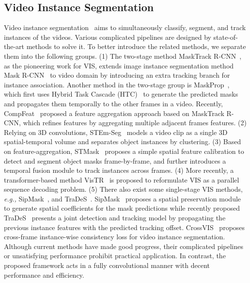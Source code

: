 \documentclass[runningheads]{llncs}
\begin{document}
\subsection{Video Instance Segmentation}
Video instance segmentation~\cite{yang2019video} aims to simultaneously classify, segment, and track instances of the videos. Various complicated pipelines are designed by state-of-the-art methods to solve it. To better introduce the related methods, we separate them into the following groups. (1) The two-stage method MaskTrack R-CNN~\cite{yang2019video}, as the pioneering work for VIS, extends image instance segmentation method Mask R-CNN~\cite{he2017mask} to video domain by introducing an extra tracking branch for instance association. Another method in the two-stage group is MaskProp~\cite{bertasius2020classifying}, which first uses Hybrid Task Cascade (HTC)~\cite{chen2019hybrid} to generate the predicted masks and propagates them temporally to the other frames in a video. Recently, CompFeat~\cite{fu2020compfeat} proposed a feature aggregation approach based on MaskTrack R-CNN, which refines features by aggregating multiple adjacent frames features. (2) Relying on 3D convolutions, STEm-Seg~\cite{athar2020stem} models a video clip as a single 3D spatial-temporal volume and separates object instances by clustering. (3) Based on feature-aggregation, STMask~\cite{li2021spatial} proposes a simple spatial feature calibration to detect and segment object masks frame-by-frame, and further introduces a temporal fusion module to track instances across frames. (4) More recently, a transformer-based method VisTR~\cite{wang2021end} is proposed to reformulate VIS as a parallel sequence decoding problem. (5) There also exist some single-stage VIS methods, {\em e.g.,} SipMask~\cite{cao2020sipmask}, and TraDeS~\cite{wu2021track}. SipMask~\cite{cao2020sipmask} proposes a spatial preservation module to generate spatial coefficients for the mask predictions while recently proposed TraDeS~\cite{wu2021track} presents a joint detection and tracking model by propagating the previous instance features with the predicted tracking offset. CrossVIS~\cite{yang2021crossover} proposes cross-frame instance-wise consistency loss for video instance segmentation. Although current methods have made good progress, their complicated pipelines or unsatisfying performance prohibit practical application. In contrast, the proposed framework acts in a fully convolutional manner with decent performance and efficiency.
\end{document}
